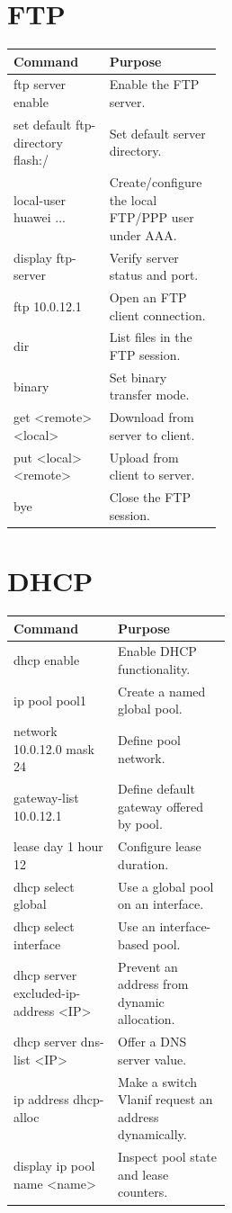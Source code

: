 \section*{FTP}
\begin{tabularx}{\linewidth}{>{\ttfamily}p{0.46\linewidth}X}
\toprule
Command & Purpose\\\midrule
ftp server enable & Enable the FTP server.\\
set default ftp-directory flash:/ & Set default server directory.\\
local-user huawei ... & Create/configure the local FTP/PPP user under AAA.\\
display ftp-server & Verify server status and port.\\
ftp 10.0.12.1 & Open an FTP client connection.\\
dir & List files in the FTP session.\\
binary & Set binary transfer mode.\\
get <remote> <local> & Download from server to client.\\
put <local> <remote> & Upload from client to server.\\
bye & Close the FTP session.\\\bottomrule
\end{tabularx}

\section*{DHCP}
\begin{tabularx}{\linewidth}{>{\ttfamily}p{0.48\linewidth}X}
\toprule
Command & Purpose\\\midrule
dhcp enable & Enable DHCP functionality.\\
ip pool pool1 & Create a named global pool.\\
network 10.0.12.0 mask 24 & Define pool network.\\
gateway-list 10.0.12.1 & Define default gateway offered by pool.\\
lease day 1 hour 12 & Configure lease duration.\\
dhcp select global & Use a global pool on an interface.\\
dhcp select interface & Use an interface-based pool.\\
dhcp server excluded-ip-address <IP> & Prevent an address from dynamic allocation.\\
dhcp server dns-list <IP> & Offer a DNS server value.\\
ip address dhcp-alloc & Make a switch Vlanif request an address dynamically.\\
display ip pool name <name> & Inspect pool state and lease counters.\\\bottomrule
\end{tabularx}

